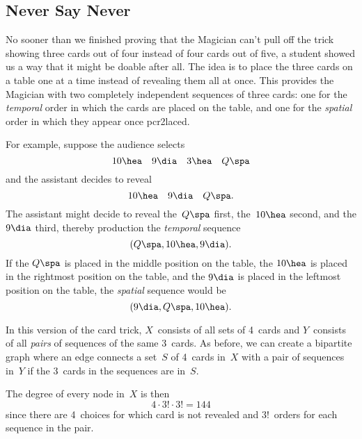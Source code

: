 \begin{editingnotes}


\subsection{Never Say Never}

No sooner than we finished proving that the Magician can't pull off
the trick showing three cards out of four instead of four cards out of
five, a student showed us a way that it might be doable after all.
The idea is to place the three cards on a table one at a time instead
of revealing them all at once.  This provides the Magician with two
completely independent sequences of three cards: one for the
\emph{temporal} order in which the cards are placed on the table, and
one for the \emph{spatial} order in which they appear once pcr2laced.

For example, suppose the audience selects
\begin{equation*}
    10 \hea \quad 9 \dia \quad 3\hea \quad Q\spa
\end{equation*}
and the assistant decides to reveal
\begin{equation*}
    10 \hea \quad 9 \dia  \quad Q\spa.
\end{equation*}
The assistant might decide to reveal the~$Q\spa$ first, the~$10\hea$
second, and the $9\dia$ third, thereby production the \emph{temporal}
sequence
\begin{equation*}
    (Q\spa, 10\hea, 9\dia).
\end{equation*}
If the $Q\spa$ is placed in the middle position on the table, the
$10\hea$ is placed in the rightmost position on the table, and the
$9\dia$ is placed in the leftmost position on the table, the
\emph{spatial} sequence would be
\begin{equation*}
    (9\dia, Q\spa, 10\hea).
\end{equation*}

In this version of the card trick, $X$~consists of all sets of 4~cards
and $Y$~consists of all \emph{pairs} of sequences of the same 3~cards.  As
before, we can create a bipartite graph where an edge connects a
set~$S$ of 4~cards in~$X$ with a pair of sequences in~$Y$ if the
3~cards in the sequences are in~$S$.

The degree of every node in~$X$ is then
\begin{equation*}
    4 \cdot 3! \cdot 3! = 144
\end{equation*}
since there are 4~choices for which card is not revealed and
$3!$~orders for each sequence in the pair.


\end{editingnotes}
